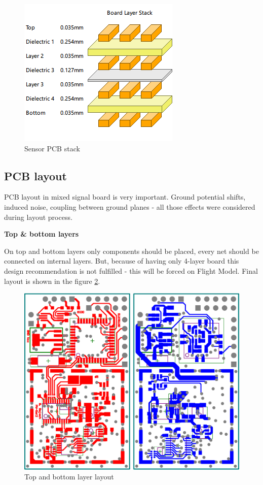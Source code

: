         \begin{figure}[H]
            \centering
            \includegraphics[width=0.3\paperwidth]{img/06/stack.png}
            \caption{Sensor PCB stack}
            \label{PCB_Altium_stack}
        \end{figure}

    \subsection{PCB layout}
        PCB layout in mixed signal board is very important. Ground potential shifts, induced noise, coupling between ground planes - all those effects were considered during layout process.

        \bigskip \textbf{Top \& bottom layers}

        On top and bottom layers only components should be placed, every net should be connected on internal layers. But, because of having only 4-layer board this design recommendation is not fulfilled - this will be forced on Flight Model. Final layout is shown in the figure \ref{top_bottom_layer_layout}.

        \begin{figure}[H]
            \centering
            \includegraphics[width=0.5\paperwidth]{img/06/top_bottom_layer_layout.eps}
            \caption{Top and bottom layer layout}
            \label{top_bottom_layer_layout}
        \end{figure}

